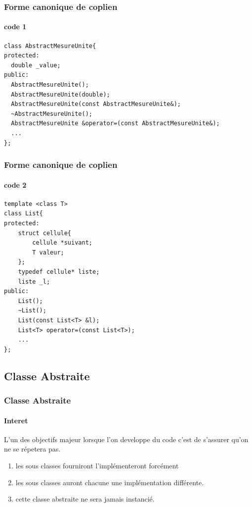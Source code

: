 \documentclass[10pt]{beamer}
\begin{document}
\begin{frame}[fragile]
  \frametitle{Forme canonique de coplien}
  \framesubtitle{code 1}

  \begin{verbatim}
class AbstractMesureUnite{
protected:
  double _value;
public:
  AbstractMesureUnite();
  AbstractMesureUnite(double);
  AbstractMesureUnite(const AbstractMesureUnite&);
  ~AbstractMesureUnite();
  AbstractMesureUnite &operator=(const AbstractMesureUnite&);
  ...
};
  \end{verbatim}
\end{frame}

\begin{frame}[fragile]
  \frametitle{Forme canonique de coplien}
  \framesubtitle{code 2}

  \begin{verbatim}
template <class T>
class List{
protected:
    struct cellule{
        cellule *suivant;
        T valeur;
    };
    typedef cellule* liste;
    liste _l;
public:
    List();
    ~List();
    List(const List<T> &l);
    List<T> operator=(const List<T>);
    ...
};
  \end{verbatim}
\end{frame}

\subsection{Classe Abstraite}
\begin{frame}
  \frametitle{Classe Abstraite}
  \framesubtitle{Interet}

  L'un des objectifs majeur lorsque l'on developpe du code c'est de s'assurer qu'on ne se répetera pas.\\


  \begin{enumerate}
    \item les sous classes fourniront l'implémenteront forcément
    \item les sous classes auront chacune une implémentation différente.
    \item cette classe abstraite ne sera jamais instancié.
  \end{enumerate}
\end{frame}
\end{document}
